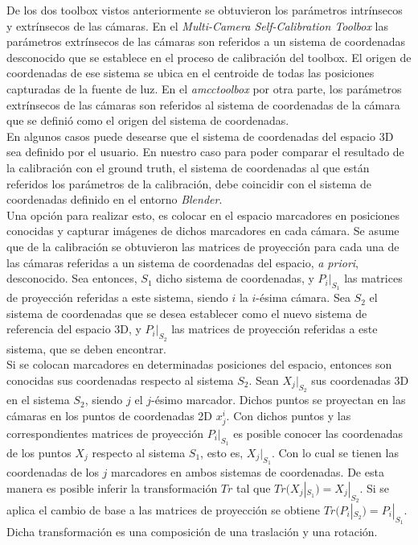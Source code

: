 De los dos toolbox vistos anteriormente se obtuvieron los parámetros intrínsecos y extrínsecos de las cámaras. En el \textit{Multi-Camera Self-Calibration Toolbox} las parámetros extrínsecos de las cámaras son referidos a un sistema de coordenadas desconocido que se establece en el proceso de calibración del toolbox. El origen de coordenadas de ese sistema se ubica en el centroide de todas las posiciones capturadas de la fuente de luz. En el \textit{amcctoolbox} por otra parte, los parámetros extrínsecos de las cámaras son referidos al sistema de coordenadas de la cámara que se definió como el origen del sistema de coordenadas.\\

 En algunos casos puede desearse que el sistema de coordenadas del espacio 3D sea definido por el usuario. En nuestro caso para poder comparar el resultado de la calibración con el ground truth, el sistema de coordenadas al que están referidos los parámetros de la calibración, debe coincidir con el sistema de coordenadas  definido en el entorno \emph{Blender}.\\

Una opción para realizar esto, es colocar en el espacio marcadores en posiciones conocidas y capturar imágenes de dichos marcadores en cada cámara. Se asume que de la calibración se obtuvieron las matrices de proyección para cada una de las cámaras referidas a un sistema de coordenadas del espacio, \textit{a priori}, desconocido. Sea entonces, $S_1$ dicho sistema de coordenadas, y $P_i|_{S_1}$ las matrices de proyección referidas a este sistema, siendo $i$ la $i$-ésima cámara. Sea $S_2$ el sistema de coordenadas que se desea establecer como el nuevo sistema de referencia del espacio 3D, y $P_i|_{S_2}$ las matrices de proyección referidas a este sistema, que se deben encontrar.\\

Si se colocan marcadores en determinadas posiciones del espacio, entonces son conocidas sus coordenadas respecto al sistema $S_2$. Sean $X_j|_{S_2}$ sus coordenadas 3D en el sistema $S_2$, siendo $j$ el $j$-ésimo marcador. Dichos puntos se proyectan en las cámaras en los puntos de coordenadas 2D $x_j^i$. Con dichos puntos y las correspondientes matrices de proyección $P_i|_{S_1}$ es posible conocer las coordenadas de los puntos $X_j$ respecto al sistema $S_1$, esto es, $X_j|_{S_1}$. Con lo cual se tienen las coordenadas de los $j$ marcadores en ambos sistemas de coordenadas. De esta manera es posible inferir la transformación $Tr$ tal que $Tr(X_j|_{S_1}) = X_j|_{S_2}$. Si se aplica el cambio de base a las matrices de proyección se obtiene $Tr(P_i|_{S_2}) = P_i|_{S_1} $. Dicha transformación es una composición de una traslación y una rotación.


